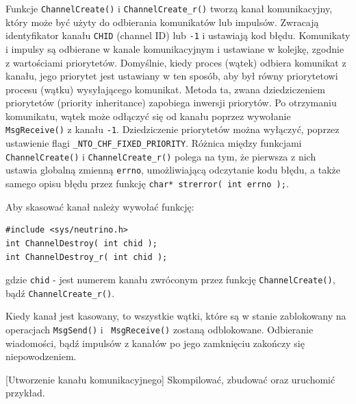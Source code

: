 Funkcje \lstinline[style=MyCStyle]{ChannelCreate()} i \lstinline[style=MyCStyle]{ChannelCreate_r()}  tworzą kanał komunikacyjny, który może być użyty do odbierania komunikatów lub impulsów. Zwracają identyfikator kanału \lstinline[style=MyCStyle]{CHID} (channel ID) lub \lstinline[style=MyCStyle]{-1} i ustawiają kod błędu. Komunikaty i impulsy są odbierane w kanale komunikacyjnym i ustawiane w kolejkę, zgodnie z wartościami priorytetów. Domyślnie, kiedy proces (wątek) odbiera komunikat z kanału, jego priorytet jest ustawiany w ten sposób, aby był równy priorytetowi procesu (wątku) wysyłającego komunikat. Metoda ta, zwana dziedziczeniem priorytetów (priority inheritance) zapobiega inwersji priorytów. Po otrzymaniu komunikatu, wątek może odłączyć się od kanału poprzez wywołanie \lstinline[style=MyCStyle]{MsgReceive()} z kanału \lstinline[style=MyCStyle]{-1}.  Dziedziczenie priorytetów można wyłączyć, poprzez ustawienie flagi \lstinline[style=MyCStyle]{_NTO_CHF_FIXED_PRIORITY}. Różnica między funkcjami \lstinline[style=MyCStyle]{ChannelCreate()}  i \lstinline[style=MyCStyle]{ChannelCreate_r()} polega na tym, że pierwsza z nich ustawia globalną zmienną \lstinline[style=MyCStyle]{errno}, umożliwiającą odczytanie kodu błędu, a także samego opisu błędu przez funkcję  \lstinline[style=MyCStyle]{char* strerror( int errno );}. 

Aby skasować kanał należy wywołać funkcję:

\begin{lstlisting}[style=MyCStyle]
#include <sys/neutrino.h>
int ChannelDestroy( int chid );
int ChannelDestroy_r( int chid );
\end{lstlisting}


gdzie \lstinline[style=MyCStyle]{chid} - jest numerem kanału zwróconym przez funkcję  \lstinline[style=MyCStyle]{ChannelCreate()}, bądź  \lstinline[style=MyCStyle]{ChannelCreate_r()}.
 
Kiedy kanał jest kasowany, to wszystkie wątki, które są w stanie zablokowany na operacjach  \lstinline[style=MyCStyle]{MsgSend()} i~ \lstinline[style=MyCStyle]{MsgReceive()} zostaną odblokowane. Odbieranie wiadomości, bądź impulsów z kanałów po jego zamknięciu zakończy się niepowodzeniem. 

\begin{example}{[Utworzenie kanału komunikacyjnego]} Skompilować, zbudować oraz uruchomić przykład. 

\end{example} 

